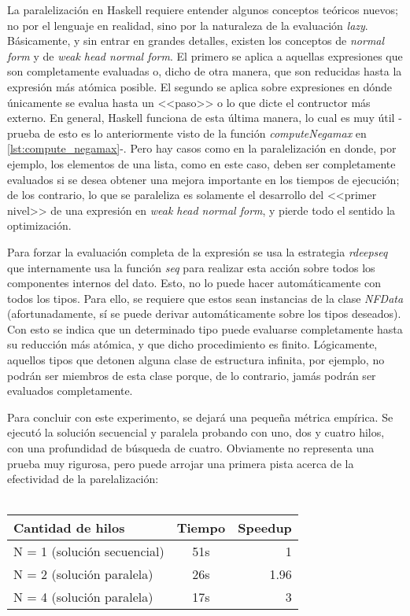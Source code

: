 \documentclass{llncs}
\begin{document}
La paralelización en Haskell requiere entender algunos conceptos teóricos nuevos; no por el lenguaje en realidad, sino por la naturaleza de la evaluación \textit{lazy}. Básicamente, y sin entrar en grandes detalles, existen los conceptos de \textit{normal form} y de  \textit{weak head normal form}. El primero se aplica a aquellas expresiones que son completamente evaluadas o, dicho de otra manera, que son reducidas hasta la expresión más atómica posible. El segundo se aplica sobre expresiones en dónde únicamente se evalua hasta un <<paso>> o lo que dicte el contructor más externo. En general, Haskell funciona de esta última manera, lo cual es muy útil -prueba de esto es lo anteriormente visto de la función \textit{computeNegamax} en \ref{lst:compute_negamax}-. Pero hay casos como en la paralelización en donde, por ejemplo, los elementos de una lista, como en este caso, deben ser completamente evaluados si se desea obtener una mejora importante en los tiempos de ejecución; de los contrario, lo que se paraleliza es solamente el desarrollo del <<primer nivel>> de una expresión en \textit{weak head normal form}, y pierde todo el sentido la optimización.

Para forzar la evaluación completa de la expresión se usa la estrategia \textit{rdeepseq} que internamente usa la función \textit{seq} para realizar esta acción sobre todos los componentes internos del dato. Esto, no lo puede hacer automáticamente con todos los tipos. Para ello, se requiere que estos sean instancias de la clase \textit{NFData} (afortunadamente, sí se puede derivar automáticamente sobre los tipos deseados). Con esto se indica que un determinado tipo puede evaluarse completamente hasta su reducción más atómica, y que dicho procedimiento es finito. Lógicamente, aquellos tipos que detonen alguna clase de estructura infinita, por ejemplo, no podrán ser miembros de esta clase porque, de lo contrario, jamás podrán ser evaluados completamente.

Para concluir con este experimento, se dejará una pequeña métrica empírica. Se ejecutó la solución secuencial y paralela probando con uno, dos y cuatro hilos, con una profundidad de búsqueda de cuatro. Obviamente no representa una prueba muy rigurosa, pero puede arrojar una primera pista acerca de la efectividad de la parelalización:
\\\

\setlength{\tabcolsep}{20pt}
\begin{tabular}{ l | c | r }
  Cantidad de hilos & Tiempo & Speedup \\
  \hline
  N = 1 (solución secuencial) & 51s & 1\\
  N = 2 (solución paralela)   & 26s & 1.96\\
  N = 4 (solución paralela)   & 17s & 3
\end{tabular}
\newline
\end{document}
